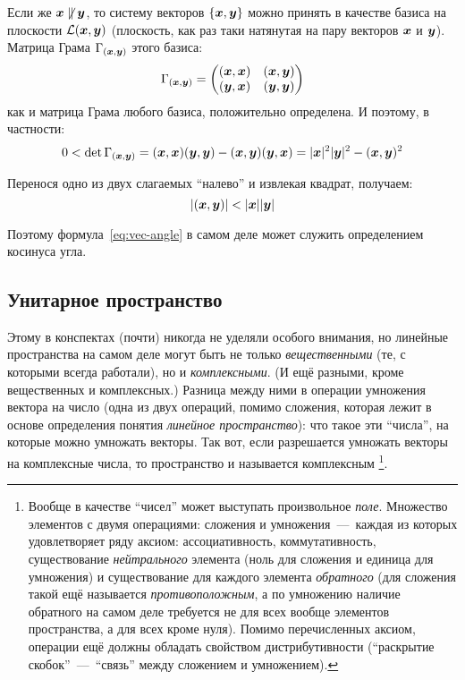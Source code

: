 \documentclass[a4paper,12pt]{article}
\begin{document}
  Если же $\bds x \hm{\not\parallel} \bds y$, то систему векторов $\{\boldsymbol x, \boldsymbol y\}$ можно принять в качестве базиса на плоскости $\mathcal L(\boldsymbol x, \boldsymbol y)$ (плоскость, как раз таки натянутая на пару векторов $\boldsymbol x$ и $\boldsymbol y$).
  Матрица Грама $\Gamma_{(\boldsymbol x, \boldsymbol y)}$ этого базиса:
  \[
    \Gamma_{(\boldsymbol x, \boldsymbol y)} = \begin{pmatrix}
      (\boldsymbol x, \boldsymbol x) & (\boldsymbol x, \boldsymbol y)\\
      (\boldsymbol y, \boldsymbol x) & (\boldsymbol y, \boldsymbol y)
    \end{pmatrix}
  \]
  как и матрица Грама любого базиса, положительно определена.
  И поэтому, в частности:
  \[
    0 < \det \Gamma_{(\boldsymbol x, \boldsymbol y)} = (\boldsymbol x, \boldsymbol x) (\boldsymbol y, \boldsymbol y) - (\boldsymbol x, \boldsymbol y) (\boldsymbol y, \boldsymbol x)
    = |\boldsymbol x|^2 |\boldsymbol y|^2 - (\boldsymbol x, \boldsymbol y)^2
  \]
  
  Перенося одно из двух слагаемых ``налево'' и извлекая квадрат, получаем:
  \[
    |(\boldsymbol x, \boldsymbol y)| < |\boldsymbol x| |\boldsymbol y|
  \]
  
  Поэтому формула~\ref{eq:vec-angle} в самом деле может служить определением косинуса угла.
  
  
  \subsection{Унитарное пространство}
  
  Этому в конспектах (почти) никогда не уделяли особого внимания, но линейные пространства на самом деле могут быть не только \emph{вещественными} (те, с которыми всегда работали), но и \emph{комплексными}.
  (И ещё разными, кроме вещественных и комплексных.)
  Разница между ними в операции умножения вектора на число (одна из двух операций, помимо сложения, которая лежит в основе определения понятия \emph{линейное пространство}): что такое эти ``числа'', на которые можно умножать векторы.
  Так вот, если разрешается умножать векторы на комплексные числа, то пространство и называется комплексным
  \footnote{Вообще в качестве ``чисел'' может выступать произвольное \emph{поле}. Множество элементов с двумя операциями: сложения и умножения~---~каждая из которых удовлетворяет ряду аксиом: ассоциативность, коммутативность, существование \emph{нейтрального} элемента (ноль для сложения и единица для умножения) и существование для каждого элемента \emph{обратного} (для сложения такой ещё называется \emph{противоположным}, а по умножению наличие обратного на самом деле требуется не для всех вообще элементов пространства, а для всех кроме нуля). Помимо перечисленных аксиом, операции ещё должны обладать свойством дистрибутивности (``раскрытие скобок''~---~``связь'' между сложением и умножением).}.
  
\end{document}
